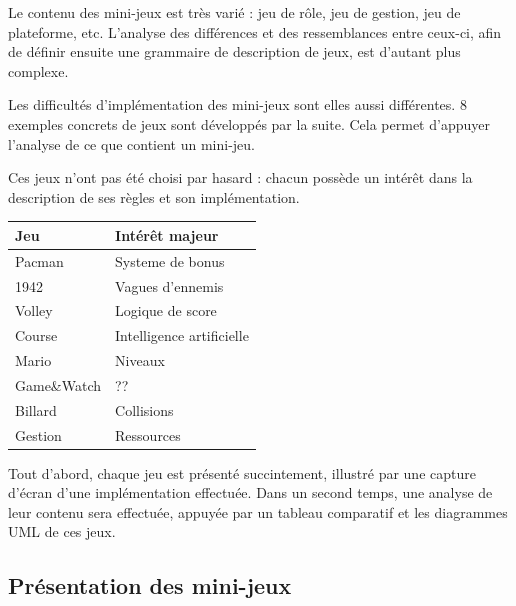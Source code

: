 
Le contenu des mini-jeux est très varié : jeu de rôle, jeu de gestion, jeu de plateforme, etc.
L'analyse des différences et des ressemblances entre ceux-ci, afin de définir ensuite une grammaire de description de jeux, est d'autant plus complexe.

Les difficultés d'implémentation des mini-jeux sont elles aussi différentes.
8 exemples concrets de jeux sont développés par la suite.
Cela permet d'appuyer l'analyse de ce que contient un mini-jeu.

Ces jeux n'ont pas été choisi par hasard : chacun possède un intérêt dans la description de ses règles et son implémentation. 

\vspace{0.5cm}

\begin{tabular}{l|l}
 Jeu & Intérêt majeur \\
 \hline
 Pacman & Systeme de bonus \\
 1942 & Vagues d'ennemis \\
 Volley & Logique de score \\
 Course & Intelligence artificielle \\
 Mario & Niveaux \\
 Game\&Watch & ?? \\
 Billard & Collisions \\
 Gestion & Ressources \\
\end{tabular}

\vspace{0.5cm}

Tout d'abord, chaque jeu est présenté succintement, illustré par une capture d'écran d'une implémentation effectuée.
Dans un second temps, une analyse de leur contenu sera effectuée, appuyée par un tableau comparatif et les diagrammes UML de ces jeux.

\clearpage

\subsection{Présentation des mini-jeux}


